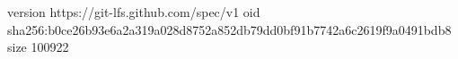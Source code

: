 version https://git-lfs.github.com/spec/v1
oid sha256:b0ce26b93e6a2a319a028d8752a852db79dd0bf91b7742a6c2619f9a0491bdb8
size 100922
